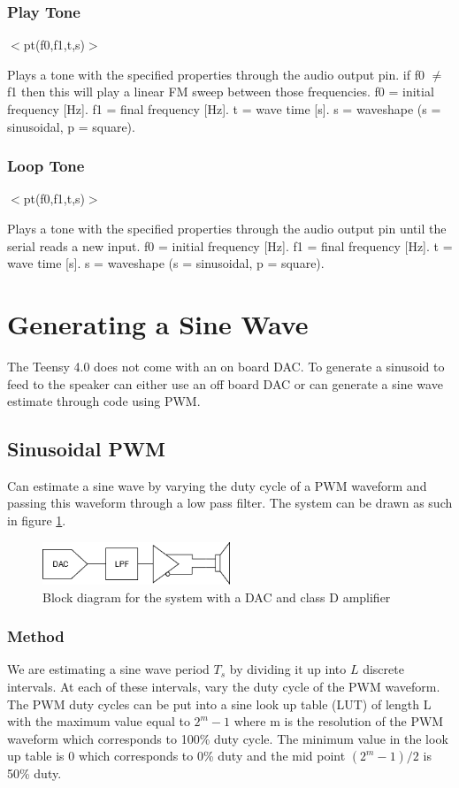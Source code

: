 \documentclass[12pt, a4paper]{article}
\begin{document}
\subsubsection{Play Tone}
\begin{center}
	$<$pt(f0,f1,t,s)$>$
\end{center}
Plays a tone with the specified properties through the audio output pin. if f0 $\neq$ f1 then this will play a linear FM sweep between those frequencies. f0 = initial frequency [Hz].
f1 = final frequency [Hz]. t = wave time [s]. s = waveshape (s = sinusoidal, p = square).
\subsubsection{Loop Tone}
\begin{center}
	$<$pt(f0,f1,t,s)$>$
\end{center}
Plays a tone with the specified properties through the audio output pin until the serial reads a new input. f0 = initial frequency [Hz]. f1 = final frequency [Hz]. t = wave time [s]. s = waveshape (s = sinusoidal, p = square).

\pagebreak
\section{Generating a Sine Wave}
The Teensy 4.0 does not come with an on board DAC. To generate a sinusoid to feed to the speaker can either use an off board DAC or can generate a sine wave estimate through code using PWM.
\subsection{Sinusoidal PWM}
Can estimate a sine wave by varying the duty cycle of a PWM waveform and passing this waveform through a low pass filter. The system can be drawn as such in figure \ref{fig:SystemPreLPF}.
\begin{figure} [!htb]
	\hfill\includegraphics[width=0.5\textwidth]{./Figures/System_Pre_LPF}\hspace{\fill}
	\caption{Block diagram for the system with a DAC and class D amplifier}
	\label{fig:SystemPreLPF}
\end{figure}

\subsubsection{Method}
We are estimating a sine wave period $T_s$ by dividing it up into $L$ discrete intervals. At each of these intervals, vary the duty cycle of the PWM waveform. The PWM duty cycles can be put into a sine look up table (LUT) of length L with the maximum value equal to $2^m - 1$ where m is the resolution of the PWM waveform which corresponds to 100\% duty cycle. The minimum value in the look up table is 0 which corresponds to 0\% duty and the mid point $(2^m-1)/2$ is 50\% duty. 
\end{document}
